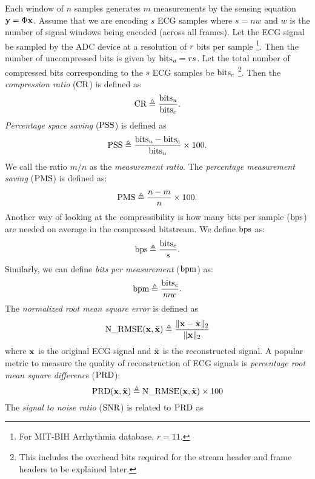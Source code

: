 Each window of $n$
samples generates $m$ measurements by the
sensing equation $\mathbf{y} = \Phi \mathbf{x}$.
Assume that we are encoding $s$ ECG samples where
$s = n w$ and $w$ is the number of signal windows
being encoded (across all frames).
Let the ECG signal be sampled by the ADC device
at a resolution of $r$ bits per sample
\footnote{For MIT-BIH Arrhythmia database, $r=11$.}.
Then the number of uncompressed bits is given by
$\mathrm{bits}_u = r s$.
Let the total number of compressed
bits corresponding to the $s$ ECG samples be
$\mathrm{bits}_c$ \footnote{This includes the overhead bits required
for the stream header and frame headers to be explained later.}.
Then the \emph{compression ratio} ($\mathrm{CR}$) is defined as
\begin{equation}
\mathrm{CR} \triangleq \frac{\mathrm{bits}_u}{\mathrm{bits}_c}.
\end{equation}
\emph{Percentage space saving} ($\mathrm{PSS}$) is defined as
\begin{equation}
\mathrm{PSS} \triangleq \frac{\mathrm{bits}_u - \mathrm{bits}_c}{\mathrm{bits}_u} \times 100.
\end{equation}
We call the ratio $m/n$ as the \emph{measurement ratio}.
The \emph{percentage measurement saving} ($\mathrm{PMS}$) is defined as:
\begin{equation}
\mathrm{PMS} \triangleq \frac{n - m}{n} \times 100.
\end{equation}
Another way of looking at the compressibility is how
many bits per sample ($\mathrm{bps}$) are needed on average in the compressed
bitstream. We define $\mathrm{bps}$ as:
\begin{equation}
\mathrm{bps} \triangleq \frac{\mathrm{bits}_c}{s}.
\end{equation}
Similarly, we can define \emph{bits per measurement} ($\mathrm{bpm}$) as:
\begin{equation}
\mathrm{bpm} \triangleq \frac{\mathrm{bits}_c}{m w}.
\end{equation}
The \emph{normalized root mean square error} is defined as
\begin{equation}
\label{eq:n-rmse}
\mathrm{N\_RMSE} (\mathbf{x}, \tilde{\mathbf{x}}) \triangleq \frac{\| \mathbf{x} - \tilde{\mathbf{x}}\|_2}{\| \mathbf{x} \|_2}
\end{equation}
where $\mathbf{x}$ is the original ECG signal and $\tilde{\mathbf{x}}$
is the reconstructed signal.
A popular metric to measure the quality of reconstruction
of ECG signals is
\emph{percentage root mean square difference} ($\mathrm{PRD}$):
\begin{equation}
\label{eq:prd}
\mathrm{PRD}(\mathbf{x}, \tilde{\mathbf{x}}) \triangleq \mathrm{N\_RMSE}(\mathbf{x}, \tilde{\mathbf{x}}) \times 100
\end{equation}
The \emph{signal to noise ratio} ($\mathrm{SNR}$) is related to $\mathrm{PRD}$ as
